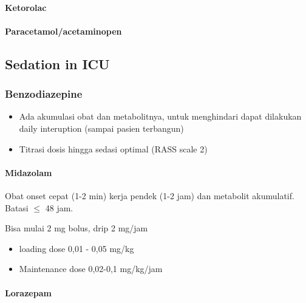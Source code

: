 \documentclass[
]{book}
\providecommand{\tightlist}{%
  \setlength{\itemsep}{0pt}\setlength{\parskip}{0pt}}
\begin{document}
\hypertarget{ketorolac}{%
\paragraph{Ketorolac}\label{ketorolac}}

\hypertarget{paracetamolacetaminopen}{%
\paragraph{Paracetamol/acetaminopen}\label{paracetamolacetaminopen}}

\hypertarget{sedation-in-icu}{%
\subsection{Sedation in ICU}\label{sedation-in-icu}}

\hypertarget{benzodiazepine}{%
\subsubsection{Benzodiazepine}\label{benzodiazepine}}

\begin{itemize}
\tightlist
\item
  Ada akumulasi obat dan metabolitnya, untuk menghindari dapat dilakukan daily interuption (sampai pasien terbangun)
\item
  Titrasi dosis hingga sedasi optimal (RASS scale 2)
\end{itemize}

\hypertarget{midazolam}{%
\paragraph{Midazolam}\label{midazolam}}

Obat onset cepat (1-2 min) kerja pendek (1-2 jam) dan metabolit akumulatif. Batasi \(\leq\) 48 jam.

Bisa mulai 2 mg bolus, drip 2 mg/jam

\begin{itemize}
\item
  loading dose
  0,01 - 0,05 mg/kg
\item
  Maintenance dose
  0,02-0,1 mg/kg/jam
\end{itemize}

\hypertarget{lorazepam}{%
\paragraph{Lorazepam}\label{lorazepam}}
\end{document}
